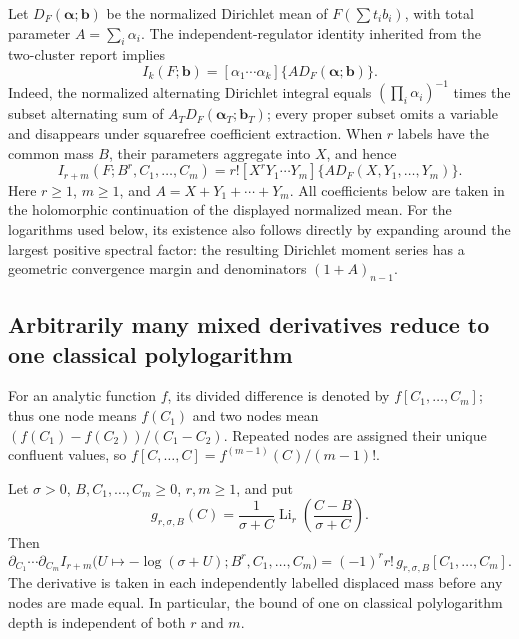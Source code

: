 Let $D_F(\boldsymbol\alpha;\boldsymbol b)$ be the normalized
Dirichlet mean of $F(\sum t_i b_i)$, with total parameter
$A=\sum_i\alpha_i$. The independent-regulator identity inherited
from the two-cluster report \cite{GammaColored} implies
\begin{equation}\label{tri:eq:coefficient}
 I_k(F;\boldsymbol b)
  =[\alpha_1\cdots\alpha_k]\{A D_F(\boldsymbol\alpha;\boldsymbol b)\}.
\end{equation}
Indeed, the normalized alternating Dirichlet integral equals
$(\prod_i\alpha_i)^{-1}$ times the subset alternating sum of
$A_TD_F(\boldsymbol\alpha_T;\boldsymbol b_T)$; every proper subset
omits a variable and disappears under squarefree coefficient
extraction. When $r$ labels have the common mass $B$, their
parameters aggregate into $X$, and hence
\begin{equation}\label{tri:eq:cluster-coefficient}
 I_{r+m}(F;B^r,C_1,\ldots,C_m)
  =r![X^rY_1\cdots Y_m]\{A D_F(X,Y_1,\ldots,Y_m)\}.
\end{equation}
Here $r\ge1$, $m\ge1$, and $A=X+Y_1+\cdots+Y_m$.
All coefficients below are taken in the holomorphic continuation
of the displayed normalized mean. For the logarithms used below,
its existence also follows directly by expanding around the largest
positive spectral factor: the resulting Dirichlet moment series
has a geometric convergence margin and denominators
$(1+A)_{n-1}$.

\subsection{Arbitrarily many mixed derivatives reduce to one classical polylogarithm}

For an analytic function $f$, its divided difference \cite{DeBoor} is denoted by
$f[C_1,\ldots,C_m]$; thus one node means $f(C_1)$ and two nodes
mean $(f(C_1)-f(C_2))/(C_1-C_2)$. Repeated nodes are assigned
their unique confluent values, so
$f[C,\ldots,C]=f^{(m-1)}(C)/(m-1)!$.

\begin{theorem}
\label{tri:thm:mixed}
Let $\sigma>0$, $B,C_1,\ldots,C_m\ge0$, $r,m\ge1$, and put
\begin{equation}\label{tri:eq:g}
 g_{r,\sigma,B}(C)=\frac{1}{\sigma+C}
       \operatorname{Li}_r\!\left(\frac{C-B}{\sigma+C}\right).
\end{equation}
Then
\begin{equation}\label{tri:eq:mixed}
 \boxed{\displaystyle
 \partial_{C_1}\cdots\partial_{C_m}
 I_{r+m}\bigl(U\mapsto-\log(\sigma+U);
                  B^r,C_1,\ldots,C_m\bigr)
 =(-1)^r r!\,g_{r,\sigma,B}[C_1,\ldots,C_m].}
\end{equation}
The derivative is taken in each independently labelled displaced
mass before any nodes are made equal. In particular, the bound of
one on classical polylogarithm depth is independent of both $r$ and
$m$.
\end{theorem}

